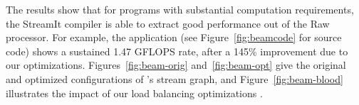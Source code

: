 The results show that for programs with substantial computation
requirements, the StreamIt compiler is able to extract good
performance out of the Raw processor.  For example, the \Radar
application (see Figure~\ref{fig:beamcode} for source code) shows a
sustained 1.47 GFLOPS rate, after a 145\% improvement due to our
optimizations.  Figures~\ref{fig:beam-orig} and~\ref{fig:beam-opt}
give the original and optimized configurations of \Radar's stream
graph, and Figure~\ref{fig:beam-blood} illustrates the impact of our
load balancing optimizations .
%

